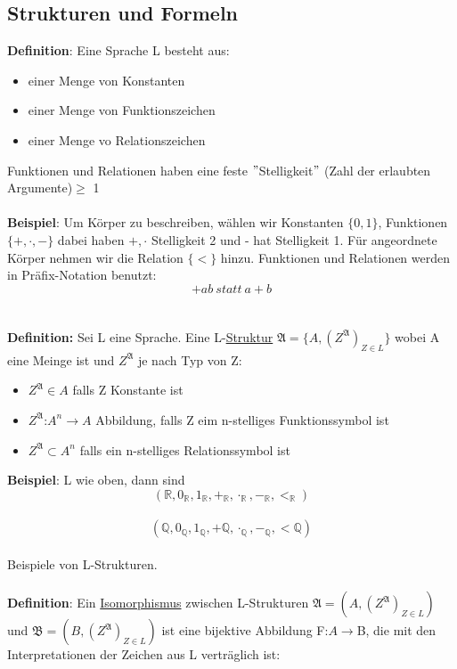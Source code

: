 \documentclass[a4paper]{scrartcl}
\begin{document}
\subsection{Strukturen und Formeln}
\textbf{Definition}: Eine Sprache L besteht aus:\\
\begin{itemize}
\item einer Menge von Konstanten
\item einer Menge von Funktionszeichen
\item einer Menge vo Relationszeichen
\end{itemize}
Funktionen und Relationen haben eine feste $"$Stelligkeit$"$ (Zahl der erlaubten Argumente)$\geq$ 1\\ \\
\textbf{Beispiel}: Um Körper zu beschreiben, wählen wir Konstanten $\{0,1\}$, Funktionen $\{+,\cdot , -\}$ dabei haben $+,\cdot$ Stelligkeit 2 und - hat Stelligkeit 1. Für angeordnete Körper nehmen wir die Relation $\{<\}$ hinzu. Funktionen und Relationen werden in Präfix-Notation benutzt:\\
$$+ab~statt~a+b$$\\ \\
\textbf{Definition:} Sei L eine Sprache. Eine L-\underline{Struktur} $\mathfrak{A} =\{A,(Z^\mathfrak{A})_{Z\in L} \}$ wobei A eine Meinge ist und $Z^\mathfrak{A}$ je nach Typ von Z:\\
\begin{itemize}
\item $Z^\mathfrak{A} \in A$ falls Z Konstante ist
\item $Z^\mathfrak{A}$:$A^n\rightarrow A$ Abbildung, falls Z eim n-stelliges Funktionssymbol ist
\item $Z^\mathfrak{A} \subset A^n$ falls ein n-stelliges Relationssymbol ist
\end{itemize}
\textbf{Beispiel}: L wie oben, dann sind\\
$$(\mathbb{R},0_\mathbb{R},1_\mathbb{R},+_\mathbb{R},\cdot_\mathbb{R},-_\mathbb{R},<_\mathbb{R})$$\\
$$(\mathbb{Q},0_\mathbb{Q},1_\mathbb{Q},+\mathbb{Q},\cdot_\mathbb{Q},-_\mathbb{Q},<\mathbb{Q})$$\\
Beispiele von L-Strukturen.\\ \\
\textbf{Definition}: Ein \underline{Isomorphismus} zwischen L-Strukturen $\mathfrak{A}=(A,(Z^\mathfrak{A})_{Z\in L})$ und $\mathfrak{B}=(B,(Z^\mathfrak{A})_{Z\in L})$ ist eine bijektive Abbildung F:$A\rightarrow$B, die mit den Interpretationen der Zeichen aus L verträglich ist:\\
\end{document}

